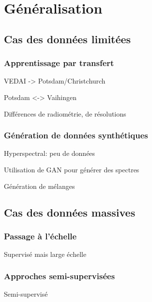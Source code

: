 \chapter{Généralisation}

\section{Cas des données limitées}

\subsection{Apprentissage par transfert}

VEDAI -> Potsdam/Christchurch

Potsdam <-> Vaihingen

Différences de radiométrie, de résolutions

\subsection{Génération de données synthétiques}

Hyperspectral: peu de données

Utilisation de GAN pour générer des spectres

Génération de mélanges

\section{Cas des données massives}

\subsection{Passage à l'échelle}

Supervisé mais large échelle

\subsection{Approches semi-supervisées}

Semi-supervisé
